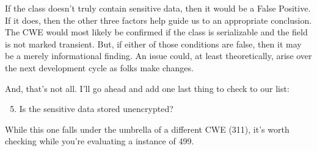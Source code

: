 If the class doesn't truly contain sensitive data, then it would be a False Positive. If it does, then the other three factors help guide us to an appropriate conclusion. The CWE would most likely be confirmed if the class is serializable and the field is not marked transient. But, if either of those conditions are false, then it may be a merely informational finding. An issue could, at least theoretically, arise over the next development cycle as folks make changes.

And, that's not all. I'll go ahead and add one last thing to check to our list:
\begin{enumerate}
	\setcounter{enumi}{4}
	\item Is the sensitive data stored unencrypted?
\end{enumerate}

While this one falls under the umbrella of a different CWE (311), it's worth checking while you're evaluating a instance of 499.
